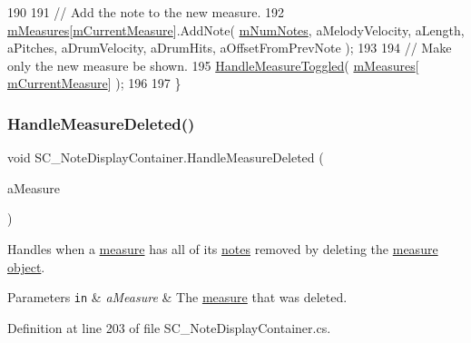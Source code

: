 \begin{DoxyCode}
190 
191         \textcolor{comment}{// Add the note to the new measure.}
192         \hyperlink{group___s_c___n_d_c_priv_var_gaa072fb53f6bd6646bc85f2ebc2a02229}{mMeasures}[\hyperlink{group___s_c___n_d_c_priv_var_ga28ce2bf8358c9f686b5b9e362aa96dff}{mCurrentMeasure}].AddNote( \hyperlink{group___s_c___n_d_c_priv_var_gae06a4919a63806ed57b2040f41b7ca1b}{mNumNotes}, aMelodyVelocity, 
      aLength, aPitches, aDrumVelocity, aDrumHits, aOffsetFromPrevNote );
193 
194         \textcolor{comment}{// Make only the new measure be shown.}
195         \hyperlink{group___s_c___n_d_c_handlers_ga458d57203645be514d3626211044b584}{HandleMeasureToggled}( \hyperlink{group___s_c___n_d_c_priv_var_gaa072fb53f6bd6646bc85f2ebc2a02229}{mMeasures}[
      \hyperlink{group___s_c___n_d_c_priv_var_ga28ce2bf8358c9f686b5b9e362aa96dff}{mCurrentMeasure}] );
196 
197     \}
\end{DoxyCode}
\mbox{\label{group___s_c___n_d_c_handlers_ga40ffb2c779af43930924348c265c9e09}} 
\subsubsection{\texorpdfstring{Handle\+Measure\+Deleted()}{HandleMeasureDeleted()}}
{\footnotesize\ttfamily void S\+C\+\_\+\+Note\+Display\+Container.\+Handle\+Measure\+Deleted (\begin{DoxyParamCaption}\item[{\hyperlink{class_s_c___measure_display_panel}{S\+C\+\_\+\+Measure\+Display\+Panel}}]{a\+Measure }\end{DoxyParamCaption})}



Handles when a \hyperlink{group___doc_s_c___m_d_p}{measure} has all of its \hyperlink{group___music_structs_struct_music_1_1_combined_note}{notes} removed by deleting the \hyperlink{group___doc_s_c___m_d_p}{measure object}. 


\begin{DoxyParams}[1]{Parameters}
\mbox{\tt in}  & {\em a\+Measure} & The \hyperlink{group___doc_s_c___m_d_p}{measure} that was deleted. \\
\hline
\end{DoxyParams}


Definition at line 203 of file S\+C\+\_\+\+Note\+Display\+Container.\+cs.



